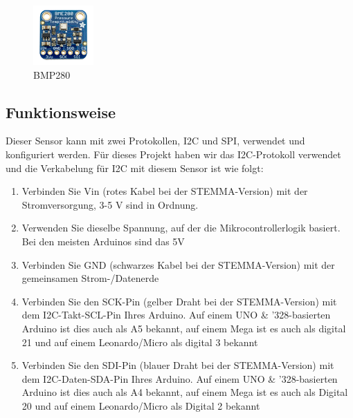 \documentclass[conference]{IEEEtran}
\begin{document}
\begin{figure}
	\centering
	\includegraphics[width=0.47\linewidth]{fig35}
	\caption{BMP280 }
	\label{fig:fig35}
\end{figure}

\subsection{Funktionsweise}
Dieser Sensor kann mit zwei Protokollen, I2C und SPI, verwendet und konfiguriert werden. Für dieses Projekt haben wir das I2C-Protokoll verwendet und die Verkabelung für I2C mit diesem Sensor ist wie folgt:

\begin{enumerate}
\item 
	Verbinden Sie Vin (rotes Kabel bei der STEMMA-Version) mit der Stromversorgung, 3-5 V sind in Ordnung. 
\item  Verwenden Sie dieselbe Spannung, auf der die Mikrocontrollerlogik basiert. Bei den meisten Arduinos sind das 5V
	
\item  Verbinden Sie GND (schwarzes Kabel bei der STEMMA-Version) mit der gemeinsamen Strom-/Datenerde
	
\item 	Verbinden Sie den SCK-Pin (gelber Draht bei der STEMMA-Version) mit dem I2C-Takt-SCL-Pin Ihres Arduino.  Auf einem UNO \& '328-basierten Arduino ist dies auch als A5 bekannt, auf einem Mega ist es auch als digital 21 und auf einem Leonardo/Micro als digital 3 bekannt
	
\item Verbinden Sie den SDI-Pin (blauer Draht bei der STEMMA-Version) mit dem I2C-Daten-SDA-Pin Ihres Arduino. Auf einem UNO \& '328-basierten Arduino ist dies auch als A4 bekannt, auf einem Mega ist es auch als Digital 20 und auf einem Leonardo/Micro als Digital 2 bekannt
\end{enumerate}
\end{document}
